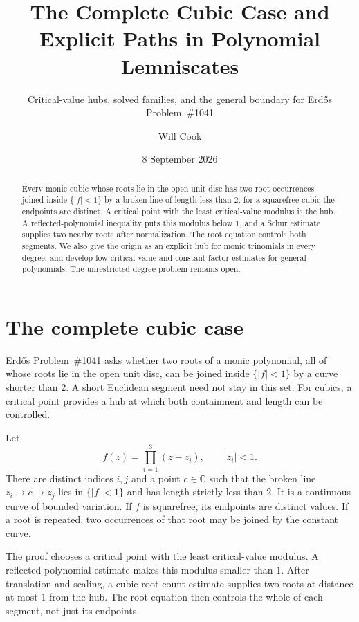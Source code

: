 \documentclass[11pt]{article}
\title{The Complete Cubic Case and\\Explicit Paths in Polynomial Lemniscates}
\subtitle{Critical-value hubs, solved families, and the general boundary for Erd\H{o}s Problem~\#1041}
\author{Will Cook}
\date{8 September 2026}
\begin{document}
\maketitle
\noteprovenance

\begin{abstract}
Every monic cubic whose roots lie in the open unit disc has two root
occurrences joined inside $\{|f|<1\}$ by a broken line of length less than
$2$; for a squarefree cubic the endpoints are distinct.  A critical point
with the least critical-value modulus is the hub.  A reflected-polynomial
inequality puts this modulus below $1$, and a Schur estimate supplies two
nearby roots after normalization.  The root equation controls both segments.
We also give the origin as an explicit hub for monic trinomials in every
degree, and develop low-critical-value and constant-factor estimates for
general polynomials.  The unrestricted degree problem remains open.
\end{abstract}

\section{The complete cubic case}
\label{sec:cubic-complete}

Erd\H{o}s Problem~\#1041 asks whether two roots of a monic polynomial,
all of whose roots lie in the open unit disc, can be joined inside
$\{|f|<1\}$ by a curve shorter than $2$.  A short Euclidean segment need
not stay in this set.  For cubics, a critical point provides a hub at which
both containment and length can be controlled.

\begin{theorem}\label{res:cubic-complete}
Let
\[
 f(z)=\prod_{i=1}^{3}(z-z_i),\qquad |z_i|<1.
\]
There are distinct indices $i,j$ and a point $c\in\mathbb C$ such that the
broken line $z_i\to c\to z_j$ lies in $\{|f|<1\}$ and has length strictly
less than $2$.  It is a continuous curve of bounded variation.  If $f$ is
squarefree, its endpoints are distinct values.  If a root is repeated, two
occurrences of that root may be joined by the constant curve.
\end{theorem}

The proof chooses a critical point with the least critical-value modulus.
A reflected-polynomial estimate makes this modulus smaller than $1$.
After translation and scaling, a cubic root-count estimate supplies two
roots at distance at most $1$ from the hub.  The root equation then controls
the whole of each segment, not just its endpoints.
\end{document}
